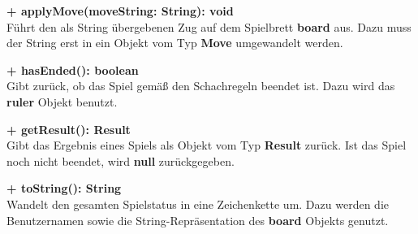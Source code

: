 \documentclass[parskip=full]{scrartcl}
\begin{document}
\begin{description}
					\item \textbf{+ applyMove(moveString: String): void}\\ Führt den als String übergebenen Zug auf dem Spielbrett \textbf{board} aus. Dazu muss der String erst in ein Objekt vom Typ \textbf{Move} umgewandelt werden.
					\item \textbf{+ hasEnded(): boolean}\\ Gibt zurück, ob das Spiel gemäß den Schachregeln beendet ist. Dazu wird das \textbf{ruler} Objekt benutzt.
					\item \textbf{+ getResult(): Result}\\ Gibt das Ergebnis eines Spiels als Objekt vom Typ \textbf{Result} zurück. Ist das Spiel noch nicht beendet, wird \textbf{null} zurückgegeben.
					\item \textbf{+ toString(): String}\\ Wandelt den gesamten Spielstatus in eine Zeichenkette um. Dazu werden die Benutzernamen sowie die String-Repräsentation des \textbf{board} Objekts genutzt.
				\end{description}
			
			
		\newpage
		
\end{document}
